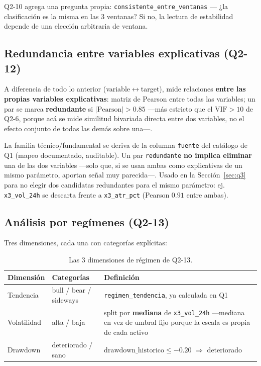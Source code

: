 \documentclass[11pt,a4paper]{article}
\newcommand{\code}[1]{\texttt{\small #1}}
\newcommand{\bigsep}{\par\vspace{3pt}}
\begin{document}
Q2-10 agrega una pregunta propia: \code{consistente\_entre\_ventanas} — ¿la clasificación
es la misma en las 3 ventanas? Si no, la lectura de estabilidad depende de una elección
arbitraria de ventana.

\subsection{Redundancia entre variables explicativas (Q2-12)}
\label{ssec:redundancia}

A diferencia de todo lo anterior (variable$\leftrightarrow$target), mide relaciones \textbf{entre las
propias variables explicativas}: matriz de Pearson entre todas las variables; un par se
marca \textbf{redundante} si \(|\text{Pearson}| > 0.85\) —más estricto que el
\(\mathrm{VIF}>10\) de Q2-6, porque acá se mide similitud bivariada directa entre dos
variables, no el efecto conjunto de todas las demás sobre una—.

\bigsep
La familia técnico/fundamental se deriva de la columna \code{fuente} del catálogo de Q1
(mapeo documentado, auditable). Un par \code{redundante} \textbf{no implica eliminar} una
de las dos variables —solo que, si se usan ambas como explicativas de un mismo parámetro,
aportan señal muy parecida—. Usado en la Sección~\ref{sec:q3} para no elegir dos
candidatas redundantes para el mismo parámetro: ej. \code{x3\_vol\_24h} se descarta frente
a \code{x3\_atr\_pct} (Pearson \(0.91\) entre ambas).

\subsection{Análisis por regímenes (Q2-13)}

Tres dimensiones, cada una con categorías explícitas:

\begin{table}[h]
\centering
\small
\begin{tabularx}{\linewidth}{@{}l l X@{}}
\toprule
\textbf{Dimensión} & \textbf{Categorías} & \textbf{Definición} \\
\midrule
Tendencia & bull / bear / sideways & \code{regimen\_tendencia}, ya calculada en Q1 \\
Volatilidad & alta / baja & split por \textbf{mediana} de \code{x3\_vol\_24h} —mediana en
  vez de umbral fijo porque la escala es propia de cada activo \\
Drawdown & deteriorado / sano & \(\text{drawdown\_historico} \leq -0.20\) \(\Rightarrow\)
  deteriorado \\
\bottomrule
\end{tabularx}
\caption{Las 3 dimensiones de régimen de Q2-13.}
\end{table}
\end{document}
